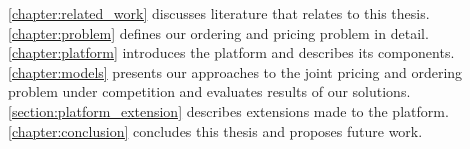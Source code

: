 \cref{chapter:related_work} discusses literature that relates to this thesis.
\cref{chapter:problem} defines our ordering and pricing problem in detail.
\cref{chapter:platform} introduces the \pricewars platform and describes its components.
\cref{chapter:models} presents our approaches to the joint pricing and ordering problem under competition and evaluates results of our solutions.
\cref{section:platform_extension} describes extensions made to the \pricewars platform.
\cref{chapter:conclusion} concludes this thesis and proposes future work.



